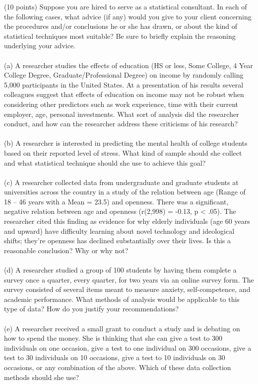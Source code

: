 \documentclass[onecolumn,10pt]{jhwhw}
\begin{document}
\problem{}
(10 points) Suppose you are hired to serve as a statistical consultant. In each of the following cases, what advice (if any) would you give to your client concerning the procedures and/or conclusions he or she has drawn, or about the kind of statistical techniques most suitable? Be sure to briefly explain the reasoning underlying your advice.\\
\\
(a) A researcher studies the effects of education (HS or less, Some College, 4 Year College Degree, Graduate/Professional Degree) on income by randomly calling 5,000 participants in the United States. At a presentation of his results several colleagues suggest that effects of education on income may not be robust when considering other predictors such as work experience, time with their current employer, age, personal investments. What sort of analysis did the researcher conduct, and how can the researcher address these criticisms of his research?\\
\\
(b) A researcher is interested in predicting the mental health of college students based on their reported level of stress. What kind of sample should she collect and what statistical technique should she use to achieve this goal?\\
\\
(c) A researcher collected data from undergraduate and graduate students at universities across the country in a study of the relation between age (Range of 18 – 46 years with a Mean = 23.5) and openness. There was a significant, negative relation between age and openness (r(2,998) = -0.13, p < .05). The researcher cited this finding as evidence for why elderly individuals (age 60 years and upward) have difficulty learning about novel technology and ideological shifts; they’re openness has declined substantially over their lives. Is this a reasonable conclusion? Why or why not?\\
\\
(d) A researcher studied a group of 100 students by having them complete a survey once a quarter, every quarter, for two years via an online survey form. The survey consisted of several items meant to measure anxiety, self-competence, and academic performance. What methods of analysis would be applicable to this type of data? How do you justify your recommendations?\\
\\
(e) A researcher received a small grant to conduct a study and is debating on how to spend the money. She is thinking that she can give a test to 300 individuals on one occasion, give a test to one individual on 300 occasions, give a test to 30 individuals on 10 occasions, give a test to 10 individuals on 30 occasions, or any combination of the above. Which of these data collection methods should she use?
\end{document}
